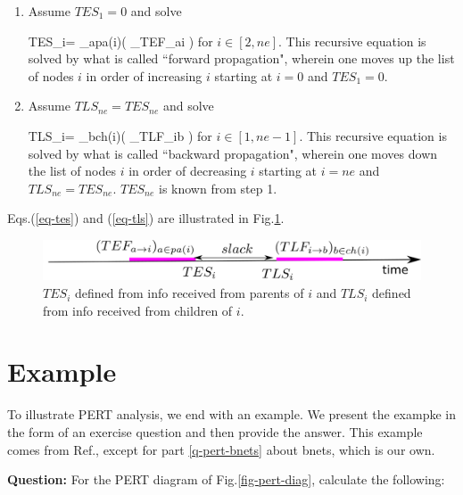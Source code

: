 \begin{enumerate}
\item Assume $TES_1=0$ and solve

\beq
TES_i= \max_{a\in pa(i)}(
_{TEF_{a\rarrow i}}
)
\;
\label{eq-tes}
\eeq
for $i\in [2, ne]$.
This recursive equation is solved
by what is called
``forward propagation",
wherein one 
moves up the list of
nodes $i$ in order 
of increasing 
$i$
starting at $i=0$ and $TES_1=0$.

\item Assume $TLS_{ne}=TES_{ne}$ and solve

\beq
TLS_i= \min_{b\in ch(i)}(
_{TLF_{i\rarrow b}}
)
\;
\label{eq-tls}
\eeq
for $i\in [1, ne-1]$. This recursive
equation is solved
by what is called
``backward propagation",
wherein one 
moves down the list of
nodes $i$ in order 
of decreasing 
$i$
starting at $i=ne$ and $TLS_{ne}=TES_{ne}$.
$TES_{ne}$ is known from step 1.
\end{enumerate}
Eqs.(\ref{eq-tes}) and (\ref{eq-tls})
are illustrated in Fig.\ref{fig-pert-t-interval}.



\begin{figure}[h!]
\centering
\includegraphics[width=6in]{pert/pert.png}
\caption{
$TES_i$ 
defined from info received
from parents of  $i$
and  $TLS_i$
defined from info received 
from children of $i$.} 
\label{fig-pert-t-interval}
\end{figure}
\section*{Example}
To illustrate PERT analysis, we end 
with an example. We present the 
exampke
in the form of an exercise question and then
provide the answer. This example
comes from Ref.\cite{ibook},
except for part \ref{q-pert-bnets} 
about bnets, which is our own.

{\bf Question:}
For the PERT diagram of Fig.\ref{fig-pert-diag},
calculate the following:


